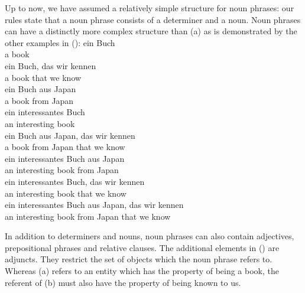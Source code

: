 \largerpage
Up to now, we have assumed a relatively simple structure for noun phrases: our rules state that a noun phrase consists of a determiner and a
noun. Noun phrases can have a distinctly more complex structure than (a) as is demonstrated
by the other examples in ():
\eal
\label{Beispiele-NP-Adjunkte}
\ex 
\gll ein Buch\\
     a   book\\
\ex
\label{ex-ein-Buch-das-wir-kennen} 
\gll ein Buch, das  wir kennen\\
     a   book  that we  know\\
\ex 
\label{ex-ein-Buch-aus-Japan}
\gll ein Buch aus  Japan\\
     a   book from Japan\\
\ex 
\gll ein interessantes Buch\\
     an   interesting   book\\
\ex 
\gll ein Buch aus  Japan, das  wir kennen\\
     a   book from Japan  that we  know\\
\ex 
\gll ein interessantes Buch aus  Japan\\
     an  interesting   book from Japan\\
\ex 
\gll ein interessantes Buch, das  wir kennen\\
     an  interesting   book  that we  know\\
\ex 
\gll ein interessantes Buch aus  Japan, das  wir kennen\\
     an  interesting   book from Japan  that we  know\\
\zl

\noindent
In addition to determiners and nouns, noun phrases can also contain adjectives, prepositional phrases and relative clauses. 
The additional elements in () are adjuncts. They restrict the set of objects which the noun phrase 
refers to. Whereas (a) refers to an entity which has the property of being a book, the referent of (b) must
also have the property of being known to us.

